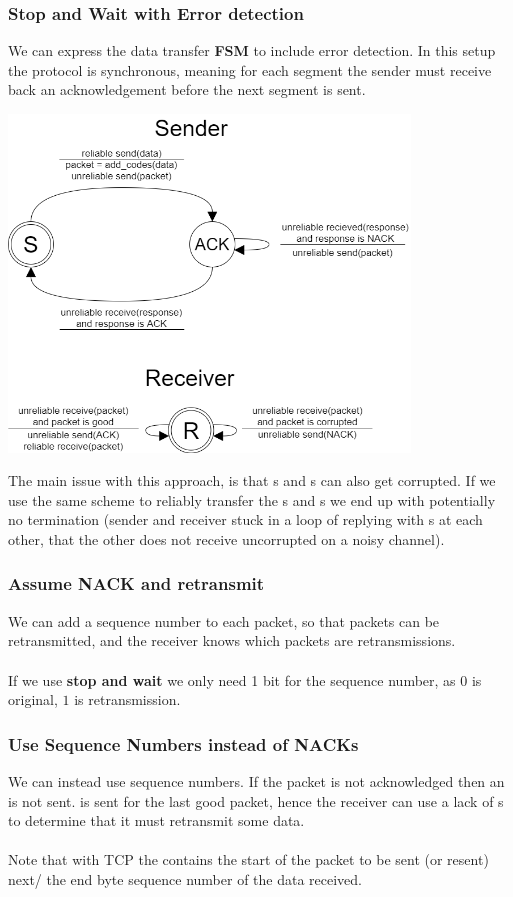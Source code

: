 \subsubsection{Stop and Wait with Error detection}
We can express the data transfer \textbf{FSM} to include error detection. In this setup the protocol is synchronous, meaning for each segment the sender must receive back an acknowledgement before the next segment is sent.
\begin{center}\includegraphics[width=0.8\textwidth]{transport_layer/images/data transfer error detection.png}\end{center}
The main issue with this approach, is that s and s can also get corrupted. If we use the same scheme to reliably transfer the s and s we end up with potentially no termination (sender and receiver stuck in a loop of replying with s at each other, that the other does not receive uncorrupted on a noisy channel).

\subsubsection{Assume NACK and retransmit}
We can add a sequence number to each packet, so that packets can be retransmitted, and the receiver knows which packets are retransmissions.
\\
\\ If we use \textbf{stop and wait} we only need 1 bit for the sequence number, as $0$ is original, $1$ is retransmission.

\subsubsection{Use Sequence Numbers instead of NACKs}
We can instead use sequence numbers. If the packet is not acknowledged then an  is not sent.  is sent for the last good packet, hence the receiver can use a lack of s to determine that it must retransmit some data.
\\
\\ Note that with TCP the  contains the start of the packet to be sent (or resent) next/ the end  byte sequence number of the data received.

